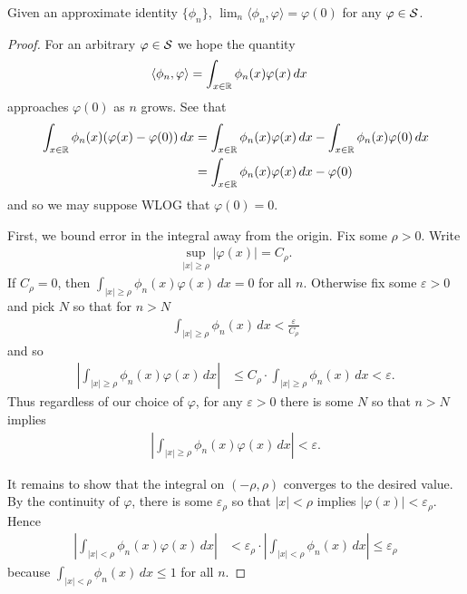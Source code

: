     \begin{thm}
      Given an approximate identity $\{\phi_n\}$, $\lim_n\langle \phi_n,\varphi\rangle = \varphi(0)$ for any $\varphi\in\S$.
    \end{thm}
    \begin{proof}
      For an arbitrary $\varphi\in\S$ we hope the quantity
      \begin{align*}
        \langle\phi_n,\varphi\rangle 
        &=\int_{x\in\R} \phi_n(x)\varphi(x)\,dx
      \end{align*}
      approaches $\varphi(0)$ as $n$ grows.
      See that
      \begin{align*}
        \int_{x\in\R} \phi_n(x)(\varphi(x)-\varphi(0))\,dx
        &= \int_{x\in\R} \phi_n(x)\varphi(x)\,dx - \int_{x\in\R} \phi_n(x)\varphi(0)\,dx
        \\&= \int_{x\in\R} \phi_n(x)\varphi(x)\,dx - \varphi(0)
      \end{align*}
      and so we may suppose WLOG that $\varphi(0)=0$.

      First, we bound error in the integral away from the origin.
      Fix some $\rho>0$.
      Write
      \begin{align*}
        \sup_{|x|\ge\rho} |\varphi(x)| = C_\rho \text{.}
      \end{align*}
      If $C_\rho=0$, then $\int_{|x|\ge\rho} \phi_n(x)\varphi(x)\,dx=0$ for all $n$.
      Otherwise fix some $\varepsilon>0$ and pick $N$ so that for $n>N$
      \begin{align*}
        \int_{|x|\ge\rho} \phi_n(x)\,dx
        < \frac\varepsilon{C_\rho}
      \end{align*}
      and so
      \begin{align*}
        \left| \int_{|x|\ge\rho} \phi_n(x)\varphi(x)\,dx \right|
        &\le C_\rho \cdot \int_{|x|\ge\rho} \phi_n(x)\,dx
        < \varepsilon \text{.}
      \end{align*}
      Thus regardless of our choice of $\varphi$, for any $\varepsilon>0$ there is some $N$ so that $n>N$ implies
      \begin{align*}
        \left| \int_{|x|\ge\rho} \phi_n(x)\varphi(x)\,dx \right|
        < \varepsilon \text{.}
      \end{align*}

      It remains to show that the integral on $(-\rho,\rho)$ converges to the desired value.
      By the continuity of $\varphi$, there is some $\varepsilon_\rho$ so that $|x|<\rho$ implies $|\varphi(x)|<\varepsilon_\rho$.
      Hence
      \begin{align*}
        \left| \int_{|x|<\rho} \phi_n(x)\varphi(x)\,dx \right|
        &< \varepsilon_\rho\cdot \left| \int_{|x|<\rho} \phi_n(x)\,dx \right|
        \le \varepsilon_\rho
      \end{align*}
      because $\int_{|x|<\rho} \phi_n(x)\,dx \le 1$ for all $n$.


\end{proof}

